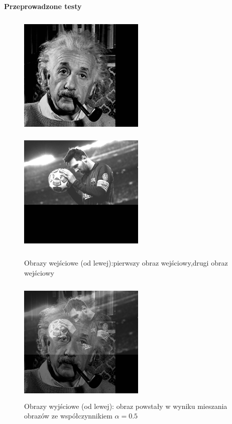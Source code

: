 \documentclass[magisterska,openany]{pracadypl}
\begin{document}
\newpage
\vspace{0.25cm}\textbf{\Large Przeprowadzone testy}
\vspace{0.5cm}
\begin{figure}[h]
\centering
\includegraphics[width=6cm, height=6cm]{2_2/ResolG1.jpg}
\includegraphics[width=6cm, height=6cm]{2_2/ResolG2.jpg}
\caption{Obrazy wejściowe (od lewej):pierwszy obraz wejściowy,drugi obraz wejściowy}
\end{figure}
\begin{figure}[h]
\centering
\includegraphics[width=6cm, height=6cm]{3_5/mixG1.jpg}
\caption{Obrazy wyjściowe (od lewej): obraz powstały w wyniku
mieszania obrazów ze współczynnikiem $\alpha=0.5$}
\end{figure}
\end{document}
